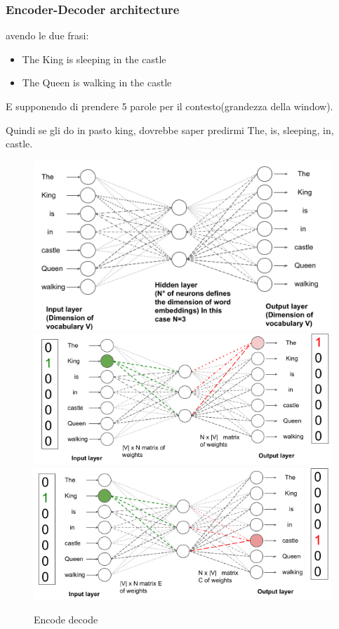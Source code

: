 \subsubsection{Encoder-Decoder architecture}
avendo le due frasi:
\begin{itemize}
    \item The King is sleeping in the castle
    \item The Queen is walking in the castle
\end{itemize}

E supponendo di prendere 5 parole per il contesto(grandezza della window).

Quindi se gli do in pasto king, dovrebbe saper predirmi {The, is, sleeping, in, castle}.


\begin{figure}[H]
    \centering
    \includegraphics[width=0.7\linewidth]{imgs/encode-decode1}
    \includegraphics[width=0.7\linewidth]{imgs/encode-decode2}
    \includegraphics[width=0.7\linewidth]{imgs/encode-decode3}

    \caption{Encode decode}
    \label{fig:encode-decode1}
\end{figure}


